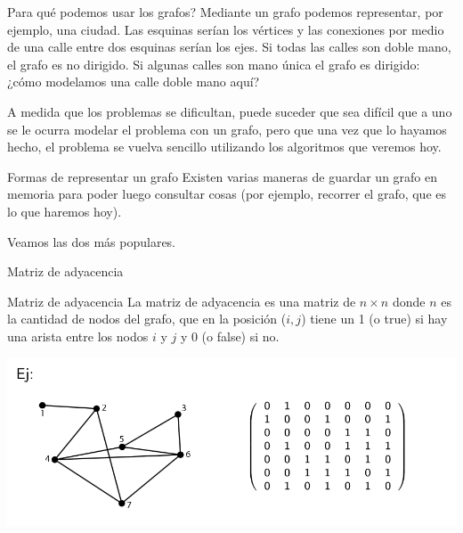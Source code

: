 \documentclass[compress]{beamer}
\begin{document}
\begin{frame}{\textquestiondown Para qué podemos usar los grafos?}
Mediante un grafo podemos representar, por ejemplo, una ciudad. Las esquinas serían los vértices y las conexiones por medio de una calle entre dos esquinas serían los ejes. Si todas las calles son doble mano, el grafo es no dirigido.
Si algunas calles son mano única el grafo es dirigido: ¿cómo modelamos una calle doble mano aquí?

\bigskip
A medida que los problemas se dificultan, puede suceder que sea difícil que a uno se le ocurra modelar el problema con un grafo, pero que una vez que lo hayamos hecho, el problema se vuelva sencillo utilizando los algoritmos que veremos hoy. 

\end{frame}

\begin{frame}{Formas de representar un grafo}
Existen varias maneras de guardar un grafo en memoria para poder luego consultar cosas (por ejemplo, recorrer el grafo, que es lo que haremos hoy).

Veamos las dos más populares.
\end{frame}

\begin{frame}{Matriz de adyacencia}
\begin{block}{Matriz de adyacencia}
La matriz de adyacencia es una matriz de $n \times n$ donde $n$ es la cantidad de nodos del grafo, que en la posición ($i,j$) tiene un 1 (o true) si hay una arista entre los nodos $i$ y $j$ y 0 (o false) si no.
\end{block}

\includegraphics[scale=0.5]{matriz-adyacencia.png}
\end{frame}
\end{document}
